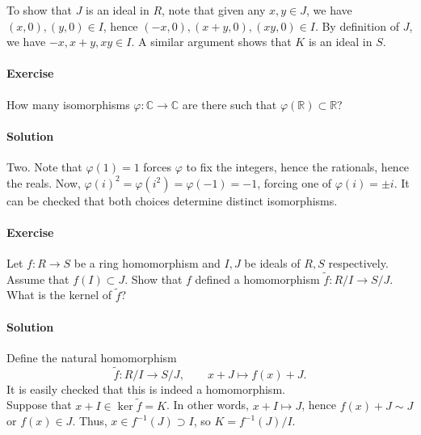 \documentclass[10pt]{article}
\newcounter{prob}
\newcommand{\problem}{\stepcounter{prob}\paragraph{Exercise \arabic{prob}}}
\newcommand{\solution}{\paragraph{Solution}}
\newcommand{\C}{\mathbb{C}}
\newcommand{\R}{\mathbb{R}}
\begin{document}
    To show that $J$ is an ideal in $R$, note that given any $x, y \in J$, we have
    $(x, 0), (y, 0) \in I$, hence $(-x, 0), (x + y, 0), (xy, 0) \in I$. By definition
    of $J$, we have $-x, x + y, xy \in I$. A similar argument shows that $K$ is an
    ideal in $S$.

    
    \problem How many isomorphisms $\varphi\colon \C \to \C$ are there such that
    $\varphi(\R) \subset \R$?

    \solution Two. Note that $\varphi(1) = 1$ forces $\varphi$ to fix the integers,
    hence the rationals, hence the reals. Now, $\varphi(i)^2 = \varphi(i^2) =
    \varphi(-1) = -1$, forcing one of $\varphi(i) = \pm i$. It can be checked that
    both choices determine distinct isomorphisms.


    \problem Let $f\colon R \to S$ be a ring homomorphism and $I, J$ be ideals of $R,
    S$ respectively. Assume that $f(I) \subset J$. Show that $f$ defined a
    homomorphism $\tilde{f}\colon R/I \to S/J$. What is the kernel of $\tilde{f}$?

    \solution Define the natural homomorphism \[
        \tilde{f}\colon R/I \to S/J, \qquad x + J \mapsto f(x) + J.
    \] It is easily checked that this is indeed a homomorphism. \\

    Suppose that $x + I \in \ker{\tilde{f}} = K$. In other words, $x + I \mapsto J$,
    hence $f(x) + J \sim J$ or $f(x) \in J$. Thus, $x \in f^{-1}(J) \supset I$, so $K
    = f^{-1}(J)/I$.
\end{document}
